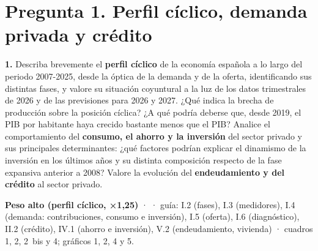 \clearpage
\section*{Pregunta 1. Perfil cíclico, demanda privada y crédito}

\begin{enunciado}
\textbf{1.} Describa brevemente el \textbf{perfil cíclico} de la economía española a lo largo del periodo 2007-2025, desde la óptica de la demanda y de la oferta, identificando sus distintas fases, y valore su situación coyuntural a la luz de los datos trimestrales de 2026 y de las previsiones para 2026 y 2027. ¿Qué indica la brecha de producción sobre la posición cíclica? ¿A qué podría deberse que, desde 2019, el PIB por habitante haya crecido bastante menos que el PIB? Analice el comportamiento del \textbf{consumo, el ahorro y la inversión} del sector privado y sus principales determinantes: ¿qué factores podrían explicar el dinamismo de la inversión en los últimos años y su distinta composición respecto de la fase expansiva anterior a 2008? Valore la evolución del \textbf{endeudamiento y del crédito} al sector privado.

\smallskip
\textbf{Peso alto (perfil cíclico, ×1,25)} ·  · guía: I.2 (fases), I.3 (medidores), I.4 (demanda: contribuciones, consumo e inversión), I.5 (oferta), I.6 (diagnóstico), II.2 (crédito), IV.1 (ahorro e inversión), V.2 (endeudamiento, vivienda) · cuadros 1, 2, 2~bis y 4; gráficos 1, 2, 4 y 5.
\end{enunciado}

